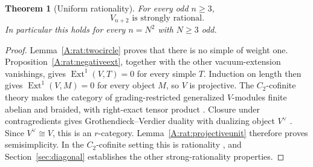 \documentclass[11pt]{article}
\newtheorem{theorem}{Theorem}[section]
\newcommand{\Ext}{\operatorname{Ext}}\newcommand{\wt}{\operatorname{wt}}
\numberwithin{equation}{section}
\begin{document}
\begin{theorem}[Uniform rationality]\label{A:rat:criterion}
For every odd $n\geq3$,
\[
 V_{n+2}\text{ is strongly rational}.
\]
In particular this holds for every $n=N^2$ with $N\geq3$ odd.
\end{theorem}
\begin{proof}
Lemma~\ref{A:rat:twocircle} proves that there is no simple of weight one. Proposition~\ref{A:rat:negativeext}, together with the other vacuum-extension vanishings, gives $\Ext^1(V,T)=0$ for every simple $T$. Induction on length then gives $\Ext^1(V,M)=0$ for every object $M$, so $V$ is projective. The $C_2$-cofinite theory makes the category of grading-restricted generalized $V$-modules finite abelian and braided, with right-exact tensor product \cite[Section~2.3]{A:McR}. Closure under contragredients gives Grothendieck--Verdier duality with dualizing object $V^\vee$ \cite[Section~4.1]{A:CMSY}. Since $V^\vee\cong V$, this is an $r$-category. Lemma~\ref{A:rat:projectiveunit} therefore proves semisimplicity. In the $C_2$-cofinite setting this is rationality \cite{A:McR}, and Section~\ref{sec:diagonal} establishes the other strong-rationality properties.
\end{proof}
\end{document}
